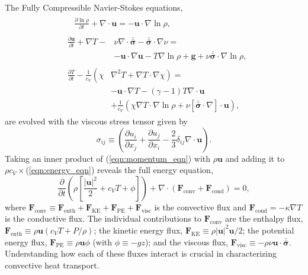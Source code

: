 \documentclass[aps, prl, twocolumn, nofootinbib, groupedaddress, amsfonts, amssymb, amsmath]{revtex4-1}
\newcommand{\Div}[1]{\ensuremath{\nabla\cdot\left( #1\right)}}
\newcommand{\grad}{\ensuremath{\nabla}}
\newcommand{\lilstressT}{\ensuremath{\bm{\bar{\bar{\sigma}}}}}
\begin{document}
The Fully Compressible Navier-Stokes equations,
\begin{align}
&\begin{aligned}
&\frac{\partial \ln\rho}{\partial t} + \grad\cdot\bm{u} 
    = -\bm{u}\cdot\grad\ln\rho,
	\label{eqn:continuity_eqn}
\end{aligned}\\
&\begin{aligned}
\frac{\partial\bm{u}}{\partial t} + \grad T - 
&\nu\grad\cdot\lilstressT - \lilstressT\cdot\grad\nu = \\
&-\bm{u}\cdot\grad\bm{u} - T\grad\ln\rho + \bm{g} + 
\nu\lilstressT\cdot\grad\ln\rho,
\label{eqn:momentum_eqn}
\end{aligned}\\
&\begin{aligned}
\frac{\partial T}{\partial t} -\frac{1}{c_V}\left(\right.\chi&\left.
    \grad^2 T + \grad T\cdot\grad\chi\right) = \\
	&-\bm{u}\cdot\grad T - (\gamma-1)T\grad\cdot{\bm{u}} \\
	&+ \frac{1}{c_V}\left(\chi\grad T \cdot\grad\ln\rho +
	\nu\left[\lilstressT\cdot\nabla\right]\cdot\bm{u}\right), 
	\label{eqn:energy_eqn}
\end{aligned}
\end{align}
are evolved with the viscous stress tensor given by
\begin{equation}
\sigma_{ij} \equiv \left(\frac{\partial u_i}{\partial x_j} + 
\frac{\partial u_j}{\partial x_i} - \frac{2}{3}\delta_{ij}\grad\cdot\bm{u}\right).
	\label{eqn:stress_tensor}
\end{equation}
Taking an inner product of
(\ref{eqn:momentum_eqn}) with $\rho\bm{u}$ and adding it to 
$\rho c_V\times$(\ref{eqn:energy_eqn}) reveals the full energy equation,
\begin{equation}
\frac{\partial}{\partial t}\left(\rho\left[\frac{|\bm{u}|^2}{2} + c_V T + \phi\right]\right) +
\Div{\bm{F}_{\text{conv}} + \bm{F}_{\text{cond}}} = 0,
	\label{eqn:energy_eqn_full}
\end{equation}
where
$
\bm{F}_{\text{conv}} \equiv \bm{F}_{\text{enth}} + \bm{F}_{\text{KE}} + \bm{F}_{\text{PE}} + \bm{F}_{\text{visc}}
$
is the convective flux and $\bm{F}_{\text{cond}} = -\kappa \grad T$
is the conductive flux.
The individual contributions to $\bm{F}_{\text{conv}}$ are the enthalpy flux, 
$\bm{F}_{\text{enth}} \equiv \rho\bm{u}(c_V T + P/\rho)$;
the kinetic energy flux, 
$\bm{F}_{\text{KE}} \equiv \rho|\bm{u}|^2\bm{u}/2$;
the potential energy flux,
$\bm{F}_{\text{PE}} \equiv \rho\bm{u}\phi$ (with $\phi \equiv -gz$);
and the viscous flux, 
$\bm{F}_{\text{visc}} \equiv -\rho\nu\bm{u}\cdot\lilstressT$.
Understanding how each of these fluxes interact  
is crucial in characterizing convective heat transport.
\end{document}

